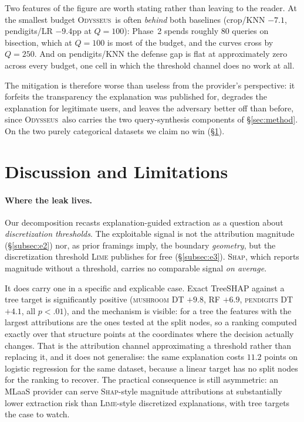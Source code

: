 \documentclass[sigconf,anonymous,review]{acmart}
\newcommand{\sys}{\textsc{Odysseus}}
\begin{document}
Two features of the figure are worth stating rather than leaving to the reader. At the smallest
budget \sys\ is often \emph{behind} both baselines (crop/KNN $-7.1$, pendigits/LR $-9.4$pp at
$Q{=}100$): Phase~2 spends roughly $80$ queries on bisection, which at $Q{=}100$ is most of the
budget, and the curves cross by $Q{=}250$. And on pendigits/KNN the defense gap is flat at
approximately zero across every budget, one cell in which the threshold channel does no work at all.

The mitigation is therefore worse than useless from the provider's perspective: it forfeits the
transparency the explanation was published for, degrades the explanation for legitimate users, and
leaves the adversary better off than before, since \sys\ also carries the two query-synthesis
components of \S\ref{sec:method}. On the two purely categorical datasets we claim no win
(\S\ref{sec:discussion}).

\section{Discussion and Limitations}
\label{sec:discussion}
\paragraph{Where the leak lives.} Our decomposition recasts explanation-guided extraction as a
question about \emph{discretization thresholds}. The exploitable signal is not the attribution magnitude
(\S\ref{subsec:e2}) nor, as prior framings imply, the boundary \emph{geometry}, but the discretization
threshold \textsc{Lime} publishes for free (\S\ref{subsec:e3}). \textsc{Shap}, which reports magnitude
without a threshold, carries no comparable signal \emph{on average}.

It does carry one in a specific and explicable case. Exact TreeSHAP against a tree target is
significantly positive (\textsc{mushroom} DT $+9.8$, RF $+6.9$, \textsc{pendigits} DT $+4.1$, all
$p{<}.01$), and the mechanism is visible: for a tree the features with the largest attributions are
the ones tested at the split nodes, so a ranking computed exactly over that structure points at the
coordinates where the decision actually changes. That is the attribution channel approximating a
threshold rather than replacing it, and it does not generalise: the same explanation costs
$11.2$ points on logistic regression for the same dataset, because a linear target has no split nodes
for the ranking to recover. The practical consequence is still asymmetric: an MLaaS provider can serve
\textsc{Shap}-style magnitude attributions at substantially lower extraction risk than
\textsc{Lime}-style discretized explanations, with tree targets the case to watch.
\end{document}
